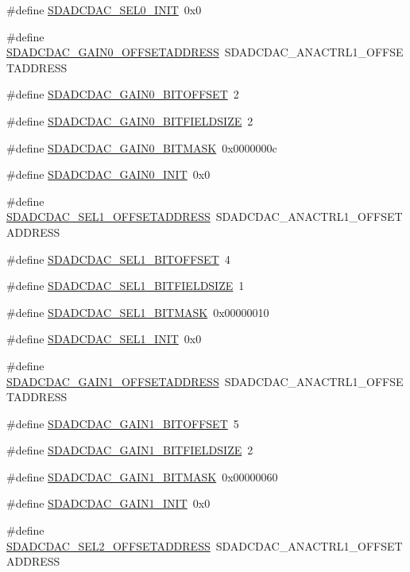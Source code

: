 \begin{DoxyCompactItemize}
\item 
\#define \hyperlink{a00569_aa95532f35fd8671f9d10a35257c9dd70}{SDADCDAC\_\-SEL0\_\-INIT}~0x0
\item 
\#define \hyperlink{a00569_aa2d59cbc93377e60931e57053f7a0567}{SDADCDAC\_\-GAIN0\_\-OFFSETADDRESS}~SDADCDAC\_\-ANACTRL1\_\-OFFSETADDRESS
\item 
\#define \hyperlink{a00569_aba3eb6900ee97dbbf95eb1554c710d14}{SDADCDAC\_\-GAIN0\_\-BITOFFSET}~2
\item 
\#define \hyperlink{a00569_ab248539b9bdf3520db81dda1741eb4e6}{SDADCDAC\_\-GAIN0\_\-BITFIELDSIZE}~2
\item 
\#define \hyperlink{a00569_afc94f5159f4c721280e5cebd4589e7b7}{SDADCDAC\_\-GAIN0\_\-BITMASK}~0x0000000c
\item 
\#define \hyperlink{a00569_ad76d51c16ec406f5dd104e92c9381562}{SDADCDAC\_\-GAIN0\_\-INIT}~0x0
\item 
\#define \hyperlink{a00569_a00aa7106210aa8d71d27f2f253a0748a}{SDADCDAC\_\-SEL1\_\-OFFSETADDRESS}~SDADCDAC\_\-ANACTRL1\_\-OFFSETADDRESS
\item 
\#define \hyperlink{a00569_af9ef286c24250158dee3b4a83c05851f}{SDADCDAC\_\-SEL1\_\-BITOFFSET}~4
\item 
\#define \hyperlink{a00569_a2c62410eac79ebb41e8b4a11e79b7364}{SDADCDAC\_\-SEL1\_\-BITFIELDSIZE}~1
\item 
\#define \hyperlink{a00569_afad88c66ab8dab3d8a291e0b70e1948f}{SDADCDAC\_\-SEL1\_\-BITMASK}~0x00000010
\item 
\#define \hyperlink{a00569_ae6a29cf90bda2a69fdc558c8a519cea1}{SDADCDAC\_\-SEL1\_\-INIT}~0x0
\item 
\#define \hyperlink{a00569_a6724cef334da2d0b8ad4f93bda150b8a}{SDADCDAC\_\-GAIN1\_\-OFFSETADDRESS}~SDADCDAC\_\-ANACTRL1\_\-OFFSETADDRESS
\item 
\#define \hyperlink{a00569_adb84e7ab513b3cb6323d1e0f45096f74}{SDADCDAC\_\-GAIN1\_\-BITOFFSET}~5
\item 
\#define \hyperlink{a00569_a0b3f7b543d43bdf609b7fda497e9c297}{SDADCDAC\_\-GAIN1\_\-BITFIELDSIZE}~2
\item 
\#define \hyperlink{a00569_a235bd5b780b9ae15541bd94be13b0831}{SDADCDAC\_\-GAIN1\_\-BITMASK}~0x00000060
\item 
\#define \hyperlink{a00569_a3d6921e6f3545afc19b71ab16dfe76f5}{SDADCDAC\_\-GAIN1\_\-INIT}~0x0
\item 
\#define \hyperlink{a00569_a30365c65691357b3491793cfa7d68f0d}{SDADCDAC\_\-SEL2\_\-OFFSETADDRESS}~SDADCDAC\_\-ANACTRL1\_\-OFFSETADDRESS

\end{DoxyCompactItemize}
